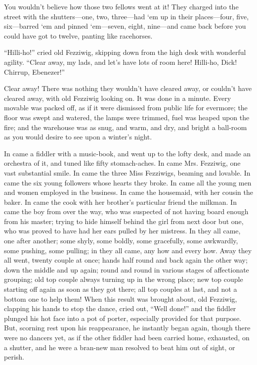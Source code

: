 \documentclass[paper=a5,BCOR=15mm,twoside,DIV=15,headinclude=off,12pt,chapterprefix=off,openany,headings=huge]{scrbook} %
\begin{document}
You wouldn't believe how those two fellows went at it! They charged into the street with the shutters—one, two, three—had `em up in their places—four, five, six—barred `em and pinned `em—seven, eight, nine—and came back before you could have got to twelve, panting like racehorses.

\enquote{Hilli-ho!} cried old Fezziwig, skipping down from the high desk with wonderful agility. \enquote{Clear away, my lads, and let's have lots of room here! Hilli-ho, Dick! Chirrup, Ebenezer!}

Clear away! There was nothing they wouldn't have cleared away, or couldn't have cleared away, with old Fezziwig looking on. It was done in a minute. Every movable was packed off, as if it were dismissed from public life for evermore; the floor was swept and watered, the lamps were trimmed, fuel was heaped upon the fire; and the warehouse was as snug, and warm, and dry, and bright a ball-room as you would desire to see upon a winter's night.

In came a fiddler with a music-book, and went up to the lofty desk, and made an orchestra of it, and tuned like fifty stomach-aches. In came Mrs. Fezziwig, one vast substantial smile. In came the three Miss Fezziwigs, beaming and lovable. In came the six young followers whose hearts they broke. In came all the young men and women employed in the business. In came the housemaid, with her cousin the baker. In came the cook with her brother's particular friend the milkman. In came the boy from over the way, who was suspected of not having board enough from his master; trying to hide himself behind the girl from next door but one, who was proved to have had her ears pulled by her mistress. In they all came, one after another; some shyly, some boldly, some gracefully, some awkwardly, some pushing, some pulling; in they all came, any how and every how. Away they all went, twenty couple at once; hands half round and back again the other way; down the middle and up again; round and round in various stages of affectionate grouping; old top couple always turning up in the wrong place; new top couple starting off again as soon as they got there; all top couples at last, and not a bottom one to help them! When this result was brought about, old Fezziwig, clapping his hands to stop the dance, cried out, \enquote{Well done!} and the fiddler plunged his hot face into a pot of porter, especially provided for that purpose. But, scorning rest upon his reappearance, he instantly began again, though there were no dancers yet, as if the other fiddler had been carried home, exhausted, on a shutter, and he were a bran-new man resolved to beat him out of sight, or perish.
\end{document}

